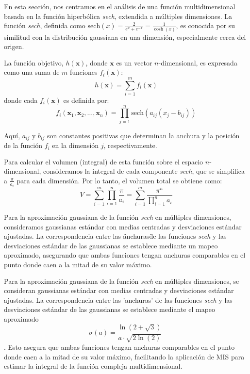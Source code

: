 \documentclass{article}
\begin{document}
En esta sección, nos centramos en el análisis de una función multidimensional basada en la función hiperbólica \textit{sech}, extendida a múltiples dimensiones. La función \textit{sech}, definida como \( \text{sech}(x) = \frac{2}{e^x + e^{-x}} = \frac{1}{\cosh(x)} \), es conocida por su similitud con la distribución gaussiana en una dimensión, especialmente cerca del origen.

La función objetivo, \( h(\mathbf{x}) \), donde \( \mathbf{x} \) es un vector \( n \)-dimensional, es expresada como una suma de \( m \) funciones \( f_i(\mathbf{x}) \):
\[ h(\mathbf{x}) = \sum_{i=1}^{m} f_i(\mathbf{x}) \]
donde cada \( f_i(\mathbf{x}) \) es definida por:
\[ f_i(\mathbf{x}_1, \mathbf{x}_2, \ldots, \mathbf{x}_n) = \prod_{j=1}^{n} \text{sech}(a_{ij} (x_j - b_{ij})) \]

Aquí, \( a_{ij} \) y \( b_{ij} \) son constantes positivas que determinan la anchura y la posición de la función \( f_i \) en la dimensión \( j \), respectivamente.

Para calcular el volumen (integral) de esta función sobre el espacio \( n \)-dimensional, consideramos la integral de cada componente \textit{sech}, que se simplifica a \( \frac{\pi}{a_i} \) para cada dimensión. Por lo tanto, el volumen total se obtiene como:
\[ V = \sum_{i=1}^{m} \prod_{i=1}^{n} \frac{\pi}{a_i} = \sum_{i=1}^{m} \frac{\pi^n}{\prod_{i=1}^{n} a_i} \]

Para la aproximación gaussiana de la función \textit{sech} en múltiples dimensiones, consideramos gaussianas estándar con medias centradas y desviaciones estándar ajustadas.
La correspondencia entre las \"anchuras\" de las funciones \textit{sech} y las desviaciones estándar de las gaussianas se establece mediante un mapeo aproximado, asegurando que ambas funciones tengan anchuras comparables en el punto donde caen a la mitad de su valor máximo.

Para la aproximación gaussiana de la función \textit{sech} en múltiples dimensiones, se consideran gaussianas estándar con medias centradas y desviaciones estándar ajustadas.
La correspondencia entre las 'anchuras' de las funciones \textit{sech} y las desviaciones estándar de las gaussianas se establece mediante el mapeo aproximado $$ \sigma(a) = \frac{\ln(2 + \sqrt{3})}{a \cdot \sqrt{2\ln(2)}} \ $$.
Esto asegura que ambas funciones tengan anchuras comparables en el punto donde caen a la mitad de su valor máximo, facilitando la aplicación de MIS para estimar la integral de la función compleja multidimensional.
\end{document}
